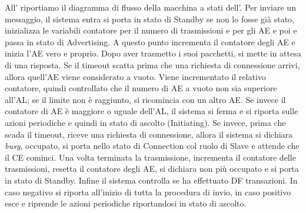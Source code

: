 All' riportiamo il diagramma di flusso della macchina a stati dell'. Per inviare un messaggio, il sistema entra si porta in stato di Standby se non lo fosse già stato, inizializza le variabili contatore per il numero di trasmissioni e per gli \acf{AE} e poi e passa in stato di Advertising. A questo punto incrementa il contatore degli \acs{AE} e inizia l'\acs{AE} vero e proprio. Dopo aver trasmetto i suoi pacchetti, si mette in attesa di una risposta. Se il timeout scatta prima che una richiesta di connessione arrivi, allora quell'\acs{AE} viene considerato a vuoto. Viene incrementato il relativo contatore, quindi controllato che il numero di \acs{AE} a vuoto non sia superiore all'\acs{AL}; se il limite non è raggiunto, si ricomincia con un altro \acs{AE}. Se invece il contatore di \acs{AE} è maggiore o uguale dell'\acs{AL}, il sistema si ferma e si riporta sulle azioni periodiche e quindi in stato di ascolto (Initiating). Se invece, prima che scada il timeout, riceve una richiesta di connessione, allora il sistema si dichiara \textit{busy}, occupato, si porta nello stato di Connection col ruolo di Slave e attende che il \acf{CE} cominci. Una volta terminata la trasmissione, incrementa il contatore delle trasmissioni, resetta il contatore degli \acs{AE}, si dichiara non più occupato e si porta in stato di Standby. Infine il sistema controlla se ha effettuato \acs{DF} transazioni. In caso negativo si riporta all'inizio di tutta la procedura di invio, in caso positivo esce e riprende le azioni periodiche riportandosi in stato di ascolto.

